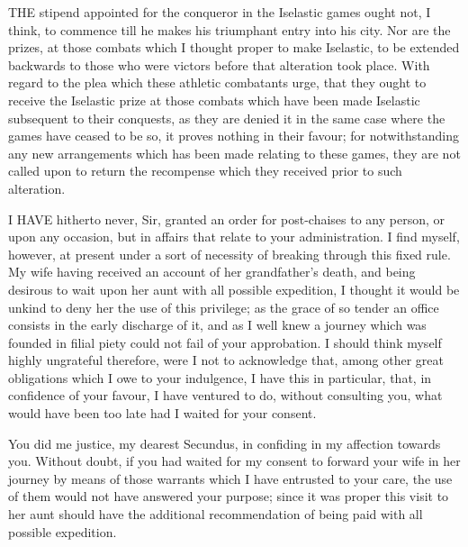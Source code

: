 
THE stipend appointed for the conqueror in the Iselastic games ought not,
I think, to commence till he makes his triumphant entry into his city. Nor
are the prizes, at those combats which I thought proper to make Iselastic,
to be extended backwards to those who were victors before that alteration
took place. With regard to the plea which these athletic combatants urge,
that they ought to receive the Iselastic prize at those combats which have
been made Iselastic subsequent to their conquests, as they are denied it
in the same case where the games have ceased to be so, it proves nothing
in their favour; for notwithstanding any new arrangements which has been
made relating to these games, they are not called upon to return the
recompense which they received prior to such alteration.


I HAVE hitherto never, Sir, granted an order for post-chaises to any
person, or upon any occasion, but in affairs that relate to your
administration. I find myself, however, at present under a sort of
necessity of breaking through this fixed rule. My wife having received an
account of her grandfather's death, and being desirous to wait upon her
aunt with all possible expedition, I thought it would be unkind to deny
her the use of this privilege; as the grace of so tender an office
consists in the early discharge of it, and as I well knew a journey which
was founded in filial piety could not fail of your approbation. I should
think myself highly ungrateful therefore, were I not to acknowledge that,
among other great obligations which I owe to your indulgence, I have this
in particular, that, in confidence of your favour, I have ventured to do,
without consulting you, what would have been too late had I waited for
your consent.


You did me justice, my dearest Secundus, in confiding in my affection
towards you. Without doubt, if you had waited for my consent to forward
your wife in her journey by means of those warrants which I have entrusted
to your care, the use of them would not have answered your purpose; since
it was proper this visit to her aunt should have the additional
recommendation of being paid with all possible expedition.
